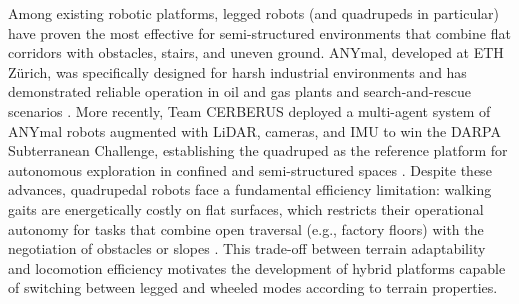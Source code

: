 \documentclass[preprint,12pt]{elsarticle}
\begin{document}
Among existing robotic platforms, legged robots (and quadrupeds in particular) have proven the most effective for semi-structured environments that combine flat corridors with obstacles, stairs, and uneven ground. ANYmal, developed at ETH Z\"{u}rich, was specifically designed for harsh industrial environments and has demonstrated reliable operation in oil and gas plants and search-and-rescue scenarios \citep{Hutter2017ANYmal}. More recently, Team CERBERUS deployed a multi-agent system of ANYmal robots augmented with LiDAR, cameras, and IMU to win the DARPA Subterranean Challenge, establishing the quadruped as the reference platform for autonomous exploration in confined and semi-structured spaces \citep{Tranzatto2022CERBERUS}. Despite these advances, quadrupedal robots face a fundamental efficiency limitation: walking gaits are energetically costly on flat surfaces, which restricts their operational autonomy for tasks that combine open traversal (e.g., factory floors) with the negotiation of obstacles or slopes \citep{Vogel2024Ladder}. This trade-off between terrain adaptability and locomotion efficiency motivates the development of hybrid platforms capable of switching between legged and wheeled modes according to terrain properties.
\end{document}
